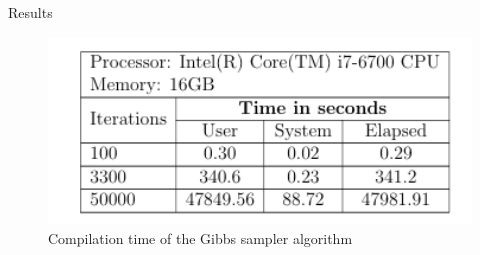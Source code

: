 \documentclass[10pt]{beamer} %
\begin{document}
\begin{frame}{Results}
\begin{figure}
    \centering
    \includegraphics[width=1\textwidth]{Tab1.png}
    \caption{Compilation time of the Gibbs sampler algorithm}
    \label{fig:my_label}
\end{figure}

\end{frame}
\end{document}
